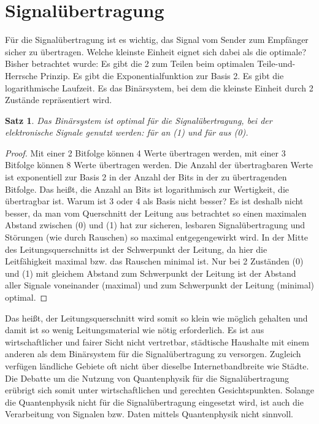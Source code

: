 \documentclass{scrartcl}
\newtheorem{satz}{Satz}[section]
\numberwithin{equation}{section}
\begin{document}
\section{Signalübertragung}
Für die Signalübertragung ist es wichtig, das Signal vom Sender zum Empfänger sicher zu übertragen. Welche kleinste Einheit eignet sich dabei als die optimale? Bisher betrachtet wurde: Es gibt die 2 zum Teilen beim optimalen Teile-und-Herrsche Prinzip. Es gibt die Exponentialfunktion zur Basis 2. Es gibt die logarithmische Laufzeit. Es das Binärsystem, bei dem die kleinste Einheit durch 2 Zustände repräsentiert wird.
\begin{satz}
	Das Binärsystem ist optimal für die Signalübertragung, bei der elektronische Signale genutzt werden: für an (1) und für aus (0).
\end{satz}
\begin{proof}
	Mit einer 2 Bitfolge können 4 Werte übertragen werden, mit einer 3 Bitfolge können 8 Werte übertragen werden. Die Anzahl der übertragbaren Werte ist exponentiell zur Basis 2 in der Anzahl der Bits in der zu übertragenden Bitfolge. Das heißt, die Anzahl an Bits ist logarithmisch zur Wertigkeit, die übertragbar ist. Warum ist 3 oder 4 als Basis nicht besser? Es ist deshalb nicht besser, da man vom Querschnitt der Leitung aus betrachtet so einen maximalen Abstand zwischen (0) und (1) hat zur sicheren, lesbaren Signalübertragung und Störungen (wie durch Rauschen) so maximal entgegengewirkt wird. In der Mitte des Leitungsquerschnitts ist der Schwerpunkt der Leitung, da hier die Leitfähigkeit maximal bzw. das Rauschen minimal ist. Nur bei 2 Zuständen (0) und (1) mit gleichem Abstand zum Schwerpunkt der Leitung ist der Abstand aller Signale voneinander (maximal) und zum Schwerpunkt der Leitung (minimal) optimal.	
\end{proof}
Das heißt, der Leitungsquerschnitt wird somit so klein wie möglich gehalten und damit ist so wenig Leitungsmaterial wie nötig erforderlich. Es ist aus wirtschaftlicher und fairer Sicht nicht vertretbar, städtische Haushalte mit einem anderen als dem Binärsystem für die Signalübertragung zu versorgen. Zugleich verfügen ländliche Gebiete oft nicht über dieselbe Internetbandbreite wie Städte. Die Debatte um die Nutzung von Quantenphysik für die Signalübertragung erübrigt sich somit unter wirtschaftlichen und gerechten Gesichtspunkten. Solange die Quantenphysik nicht für die Signalübertragung eingesetzt wird, ist auch die Verarbeitung von Signalen bzw. Daten mittels Quantenphysik nicht sinnvoll.
\end{document}
